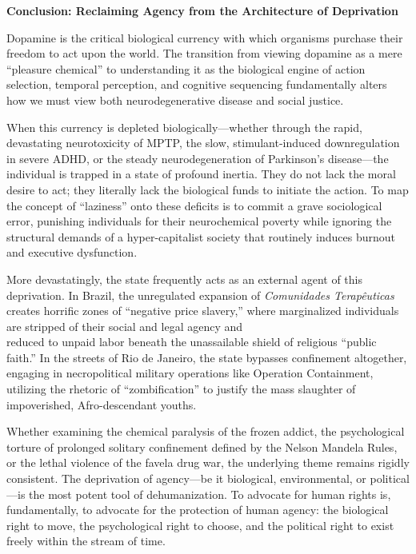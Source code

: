 \textbf{Conclusion: Reclaiming Agency from the Architecture of Deprivation}

Dopamine is the critical biological currency with which organisms purchase their freedom to act upon the world. The transition from viewing dopamine as a mere ``pleasure chemical'' to understanding it as the biological engine of action selection, temporal perception, and cognitive sequencing fundamentally alters how we must view both neurodegenerative disease and social justice.

When this currency is depleted biologically---whether through the rapid, devastating neurotoxicity of MPTP, the slow, stimulant-induced downregulation in severe ADHD, or the steady neurodegeneration of Parkinson's disease---the individual is trapped in a state of profound inertia. They do not lack the moral desire to act; they literally lack the biological funds to initiate the action. To map the concept of ``laziness'' onto these deficits is to commit a grave sociological error, punishing individuals for their neurochemical poverty while ignoring the structural demands of a hyper-capitalist society that routinely induces burnout and executive dysfunction.

More devastatingly, the state frequently acts as an external agent of this deprivation. In Brazil, the unregulated expansion of \emph{Comunidades Terapêuticas} creates horrific zones of ``negative price slavery,'' where marginalized individuals are stripped of their social and legal agency and\\
reduced to unpaid labor beneath the unassailable shield of religious ``public faith.'' In the streets of Rio de Janeiro, the state bypasses confinement altogether, engaging in necropolitical military operations like Operation Containment, utilizing the rhetoric of ``zombification'' to justify the mass slaughter of impoverished, Afro-descendant youths.

Whether examining the chemical paralysis of the frozen addict, the psychological torture of prolonged solitary confinement defined by the Nelson Mandela Rules, or the lethal violence of the favela drug war, the underlying theme remains rigidly consistent. The deprivation of agency---be it biological, environmental, or political---is the most potent tool of dehumanization. To advocate for human rights is, fundamentally, to advocate for the protection of human agency: the biological right to move, the psychological right to choose, and the political right to exist freely within the stream of time.

